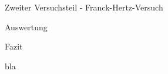 \documentclass[pdftex, a4paper,11pt, twoside, ngerman]{report}
\begin{document}
\begin{chapter}{Zweiter Versuchsteil - Franck-Hertz-Versuch}
\begin{section}{Auswertung}
    \end{section}
   
   
   
    \begin{section}{Fazit}
      \label{chp:FH:sec:Fazit}
      
      
      
    \end{section}
   
  \end{chapter}
  
  
  
  
  
  
  
  \begin{thebibliography}{99}
    \scriptsize
    bla
   
  \end{thebibliography}
 
\end{document}
